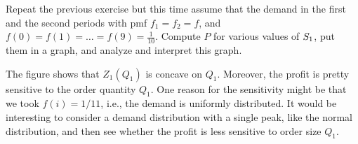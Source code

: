\begin{exercise}
Repeat the previous exercise but this time assume that the demand in the first and the second periods with pmf $f_1 = f_2 = f$, and $f(0)=f(1)=\ldots=f(9)=\frac{1}{10}$. 
Compute $P$ for various values of $S_1$, put them in a graph, and analyze and interpret this graph.

\begin{solution}

The figure shows that $Z_1(Q_1)$ is concave on $Q_1$. Moreover, the profit is pretty sensitive to the order quantity $Q_1$. One reason for the sensitivity might be that we took $f(i)=1/11$, i.e., the demand is uniformly distributed. It would be interesting to consider a demand distribution with a single peak, like the normal distribution, and then see whether the profit is less sensitive to order size $Q_1$.
\end{solution}
\end{exercise}




\clearpage

